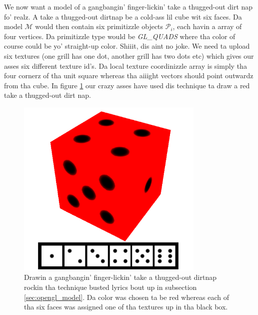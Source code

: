 We now want a model of a gangbangin' finger-lickin' take a thugged-out dirt nap fo' realz. A take a thugged-out dirtnap be a cold-ass lil cube wit six faces. Da model $\mathcal M$ would then contain six primitizzle objects $\mathcal P_i$, each havin a array of four vertices. Da primitizzle type would be \textit{GL\_QUADS} where tha color of course could be yo' straight-up color. Shiiit, dis aint no joke. We need ta upload six textures (one grill has one dot, another grill has two dots etc) which gives our asses six different texture id's. Da local texture coordinizzle array is simply tha four cornerz of tha unit square whereas tha aiiight vectors should point outwardz from tha cube. In figure \ref{fig:opengl_die} our crazy asses have used dis technique ta draw a red take a thugged-out dirt nap.
\begin{figure}[h]
\begin{center}
\includegraphics[width=0.8\textwidth, trim=0cm 0cm 0cm 0cm, clip]{opengl/figures/die.png}
\end{center}
\caption{Drawin a gangbangin' finger-lickin' take a thugged-out dirtnap rockin tha technique busted lyrics bout up in subsection \ref{sec:opengl_model}. Da color was chosen ta be red whereas each of tha six faces was assigned one of tha textures up in tha black box.}
\label{fig:opengl_die}
\end{figure}